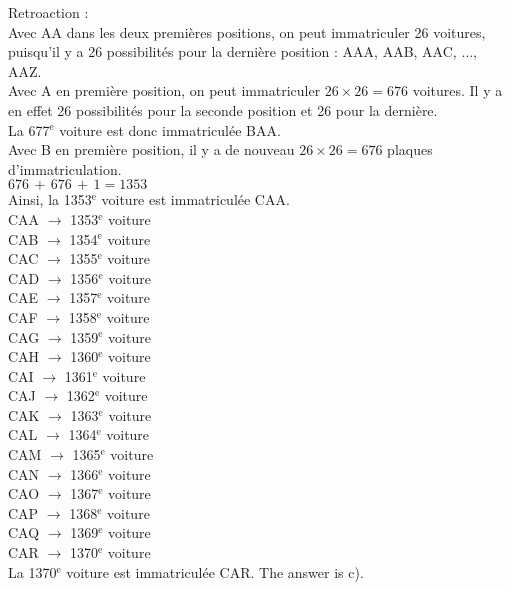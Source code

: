 ﻿\documentclass[letterpaper, 12pt]{article}
\begin{document}
Retroaction : \\
Avec AA dans les deux premi\`eres positions, on peut immatriculer 26
voitures, puisqu'il y a 26 possibilit\'es pour la derni\`ere position : AAA,
AAB, AAC, $\ldots$, AAZ.\\
Avec A en premi\`ere position, on peut immatriculer $26\times26=676$
voitures. Il y a en effet 26 possibilit\'es pour la seconde position et 26
pour la derni\`ere.  \\
La 677$^{\textrm{e}}$ voiture est donc immatricul\'ee BAA.\\
Avec B en premi\`ere position, il y a de nouveau $26\times26=676$ plaques
d'immatriculation.\\
$676\,+\,676\,+\,1=1353$\\
Ainsi, la 1353$^{\textrm{e}}$ voiture est immatricul\'ee CAA.\\
CAA $\longrightarrow$ 1353$^{\textrm{e}}$ voiture\\
CAB $\longrightarrow$ 1354$^{\textrm{e}}$ voiture\\
CAC $\longrightarrow$ 1355$^{\textrm{e}}$ voiture\\
CAD $\longrightarrow$ 1356$^{\textrm{e}}$ voiture\\
CAE $\longrightarrow$ 1357$^{\textrm{e}}$ voiture\\
CAF $\longrightarrow$ 1358$^{\textrm{e}}$ voiture\\
CAG $\longrightarrow$ 1359$^{\textrm{e}}$ voiture\\
CAH $\longrightarrow$ 1360$^{\textrm{e}}$ voiture \\
CAI $\longrightarrow$ 1361$^{\textrm{e}}$ voiture\\
CAJ $\longrightarrow$ 1362$^{\textrm{e}}$ voiture\\
CAK $\longrightarrow$ 1363$^{\textrm{e}}$ voiture\\
CAL $\longrightarrow$ 1364$^{\textrm{e}}$ voiture\\
CAM $\longrightarrow$ 1365$^{\textrm{e}}$ voiture\\
CAN $\longrightarrow$ 1366$^{\textrm{e}}$ voiture\\
CAO $\longrightarrow$ 1367$^{\textrm{e}}$ voiture\\
CAP $\longrightarrow$ 1368$^{\textrm{e}}$ voiture\\
CAQ $\longrightarrow$ 1369$^{\textrm{e}}$ voiture\\
CAR $\longrightarrow$ 1370$^{\textrm{e}}$ voiture\\
La 1370$^{\textrm{e}}$ voiture est immatricul\'ee CAR. The answer is
c).\\
\end{document}
